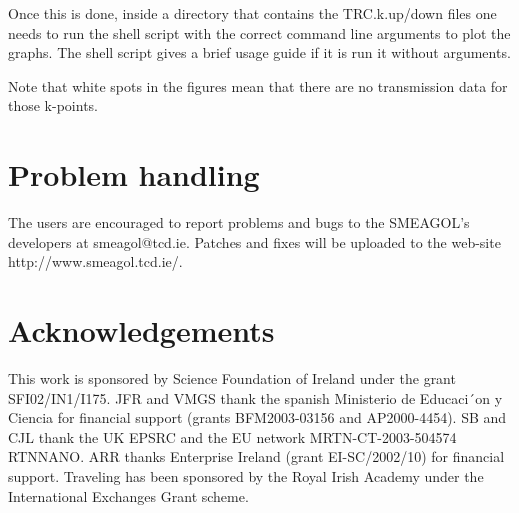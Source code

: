 \documentclass[11pt]{article}
\begin{document}
Once this is done, inside a directory that contains the TRC.k.up/down files one needs to run the  shell script with the correct command line arguments to plot the graphs. The shell script gives a brief usage guide if it is run it without arguments.

Note that white spots in the figures mean that there are no transmission data for those k-points.

\newpage
\section{Problem handling}

The users are encouraged to report problems and bugs to the SMEAGOL's developers at smeagol@tcd.ie. Patches and fixes will be uploaded to the web-site http://www.smeagol.tcd.ie/.

\section{Acknowledgements}

This work is sponsored by Science Foundation of Ireland under the grant SFI02/IN1/I175. JFR and VMGS thank the spanish Ministerio de Educaci´on y Ciencia for financial support (grants BFM2003-03156 and AP2000-4454). SB and CJL thank the UK EPSRC and the EU network MRTN-CT-2003-504574 RTNNANO. ARR thanks Enterprise Ireland (grant EI-SC/2002/10) for financial support. Traveling has been sponsored by the Royal Irish Academy under the International Exchanges Grant scheme.



\end{document}
